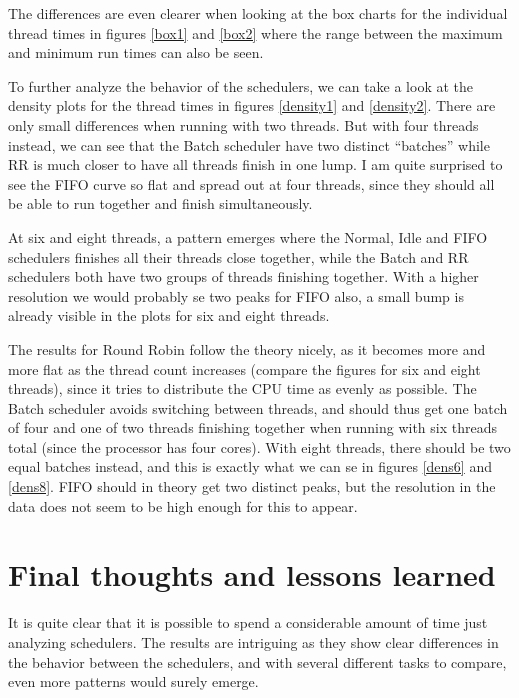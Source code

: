 \documentclass[12pt, a4paper]{article} %
\begin{document}



The differences are even clearer when looking at the box charts for the individual thread times in figures \ref{box1} and \ref{box2} where the range between the maximum and minimum run times can also be seen.



To further analyze the behavior of the schedulers, we can take a look at the density plots for the thread times in figures \ref{density1} and \ref{density2}.
There are only small differences when running with two threads.
But with four threads instead, we can see that the Batch scheduler have two distinct ``batches'' while RR is much closer to have all threads finish in one lump.
I am quite surprised to see the FIFO curve so flat and spread out at four threads, since they should all be able to run together and finish simultaneously.



At six and eight threads, a pattern emerges where the Normal, Idle and FIFO schedulers finishes all their threads close together, while the Batch and RR schedulers both have two groups of threads finishing together.
With a higher resolution we would probably se two peaks for FIFO also, a small bump is already visible in the plots for six and eight threads.

The results for Round Robin follow the theory nicely, as it becomes more and more flat as the thread count increases (compare the figures for six and eight threads), since it tries to distribute the CPU time as evenly as possible.
The Batch scheduler avoids switching between threads, and should thus get one batch of four and one of two threads finishing together when running with six threads total (since the processor has four cores).
With eight threads, there should be two equal batches instead, and this is exactly what we can se in figures \ref{dens6} and \ref{dens8}.
FIFO should in theory get two distinct peaks, but the resolution in the data does not seem to be high enough for this to appear.

\section{Final thoughts and lessons learned}

It is quite clear that it is possible to spend a considerable amount of time just analyzing schedulers.
The results are intriguing as they show clear differences in the behavior between the schedulers, and with several different tasks to compare, even more patterns would surely emerge.
\end{document}

